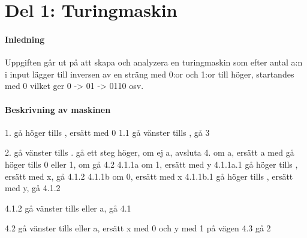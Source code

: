 \section{Del 1: Turingmaskin}
\paragraph{Inledning}    
Uppgiften går ut på att skapa och analyzera en turingmaskin som efter antal a:n i input lägger till inversen av en sträng med 0:or och 1:or till höger, startandes med 0 vilket ger 0 -> 01 -> 0110 osv.

\paragraph{Beskrivning av maskinen}
1. gå höger tills \textslash, ersätt \textslash med 0 
    1.1 gå vänster tills \textslash, gå 3

2. gå vänster tills . gå ett steg höger, om ej a, avsluta 
4. om a, ersätt a med  gå höger tills 0 eller 1, om \textslash gå 4.2 
        4.1.1a om 1, ersätt med y   
           4.1.1a.1 gå höger tills \textslash, ersätt med x, gå 4.1.2  
        4.1.1b om 0, ersätt med x 
        4.1.1b.1 gå höger tills \textslash, ersätt med y, gå 4.1.2 

        4.1.2 gå vänster tills \textslash eller a, gå 4.1  
    
    4.2 gå vänster tills \textslash eller a, ersätt x med 0 och y med 1 på vägen 
    4.3 gå 2

